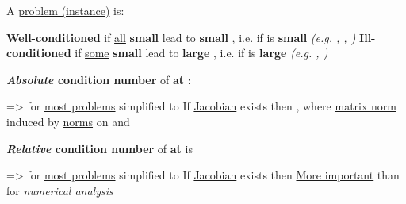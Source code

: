 A \underline{problem (instance)} is:
\begin{itemize}

      \vItem
            \textbf{Well-conditioned} if \underline{all} \textbf{small} 
            lead to \textbf{small} , i.e. if \iMbox{\kappa} is
            \textbf{small} \emph{(e.g. , , )}
      \vItem
            \textbf{Ill-conditioned} if \underline{some} \textbf{small} 
            lead to \textbf{large} , i.e. if \iMbox{\kappa} is
            \textbf{large} \emph{(e.g. , )}
\end{itemize}

\hSep %

\textbf{\emph{Absolute} condition number} 
of \textbf{ at }:
\begin{itemize}

      \vItem

            => for \underline{most problems} simplified to
      \vItem
            If \underline{Jacobian}  exists then ,
            where \underline{matrix norm} \iMbox{\lVert - \rVert} induced by \underline{norms} on  and 
\end{itemize}

\textbf{\emph{Relative} condition number}  of \textbf{ at } is
\begin{itemize}

      \vItem

            => for \underline{most problems} simplified to
      \vItem
            If \underline{Jacobian}  exists then
      \vItem
            \underline{More important} than \iMbox{\hat{\kappa}} for \emph{numerical analysis}
\end{itemize}


